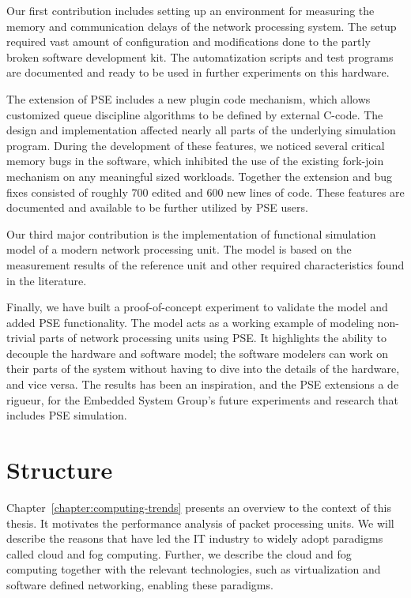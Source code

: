 
Our first contribution includes setting up an environment for measuring the memory and communication delays of the network processing system. The setup required vast amount of configuration and modifications done to the partly broken software development kit. The automatization scripts and test programs are documented and ready to be used in further experiments on this hardware.

The extension of PSE includes a new plugin code mechanism, which allows customized queue discipline algorithms to be defined by external C-code. The design and implementation affected nearly all parts of the underlying simulation program. During the development of these features, we noticed several critical memory bugs in the software, which inhibited the use of the existing fork-join mechanism on any meaningful sized workloads. Together the extension and bug fixes consisted of roughly 700 edited and 600 new lines of code. These features are documented and available to be further utilized by PSE users.

Our third major contribution is the implementation of functional simulation model of a modern network processing unit. The model is based on the measurement results of the reference unit and other required characteristics found in the literature.

Finally, we have built a proof-of-concept experiment to validate the model and added PSE functionality. The model acts as a working example of modeling non-trivial parts of network processing units using PSE. It highlights the ability to decouple the hardware and software model; the software modelers can work on their parts of the system without having to dive into the details of the hardware, and vice versa. The results has been an inspiration, and the PSE extensions a de rigueur, for the Embedded System Group's future experiments and research that includes PSE simulation.


\section{Structure}
Chapter~\ref{chapter:computing-trends} presents an overview to the context of this thesis. It motivates the performance analysis of packet processing units. We will describe the reasons that have led the IT industry to widely adopt paradigms called cloud and fog computing. Further, we describe the cloud and fog computing together with the relevant technologies, such as virtualization and software defined networking, enabling these paradigms.

